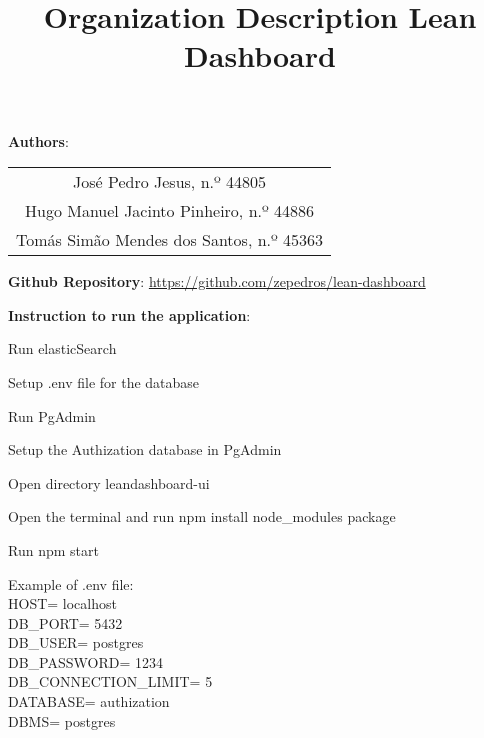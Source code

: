 \documentclass{article}
\title{\huge\textbf{Organization Description Lean Dashboard}}
\begin{document}
\maketitle

\textbf{Authors}:
\begin{center}
\begin{tabular}{ c }
 José Pedro Jesus, n.º 44805 \\
 Hugo Manuel Jacinto Pinheiro, n.º 44886 \\
 Tomás Simão Mendes dos Santos, n.º 45363
\end{tabular}
\end{center}

\textbf{Github Repository}: \url{https://github.com/zepedros/lean-dashboard}

\textbf{Instruction to run the application}:
\begin{center}
\begin{steps}
  \item Run elasticSearch
  \item Setup .env file for the database
  \item Run PgAdmin 
  \item Setup the Authization database in PgAdmin
  \item Open directory leandashboard-ui
  \item Open the terminal and run npm install node\_modules package
  \item Run npm start
 
\end{steps}
\end{center}

Example of .env file:\\

HOST= localhost \\
DB\_PORT= 5432 \\
DB\_USER= postgres \\
DB\_PASSWORD= 1234 \\
DB\_CONNECTION\_LIMIT= 5 \\
DATABASE= authization \\
DBMS= postgres \\
\end{document}
